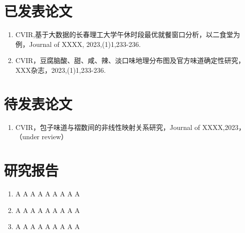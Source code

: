 
\begin{publications}

\section*{已发表论文}

\begin{enumerate}
\item CVIR,基于大数据的长春理工大学午休时段最优就餐窗口分析，以二食堂为例，Journal of XXXX, 2023,(1)1,233-236.
\item CVIR，豆腐脑酸、甜、咸、辣、淡口味地理分布图及官方味道确定性研究，XXX杂志，2023,(1)1,233-236.
\end{enumerate}

\section*{待发表论文}

\begin{enumerate}
\item CVIR，包子味道与褶数间的非线性映射关系研究，Journal of XXXX,2023，（under review）
\end{enumerate}

\section*{研究报告}
\begin{enumerate}
\item A A A A A A A A A
\item A A A A A A A A A
\item A A A A A A A A A
\end{enumerate}

\end{publications}
